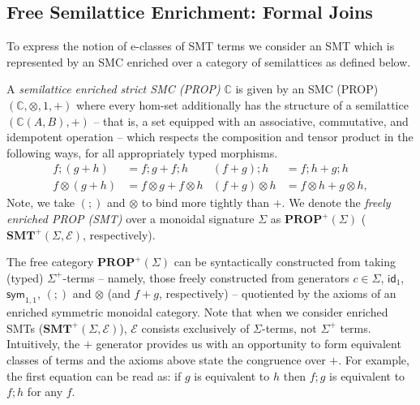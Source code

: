 \documentclass[sigconf, 9pt, nonacm]{acmart}
\newcommand\sym{\textsf{sym}}
\begin{document}
\subsection{Free Semilattice Enrichment: Formal Joins}

To express the notion of e-classes of SMT terms we consider an SMT which is represented by an SMC enriched over a category of semilattices as defined below.

\begin{definition}\label{def:enriched-prop}
A \textit{semilattice enriched strict SMC (PROP)}  $\mathbb{C}$ is given by an SMC (PROP) $(\mathbb{C}, \otimes, 1,+)$ where every hom-set additionally has the structure of a semilattice $(\mathbb{C}(A,B), +)$ -- that is,  a set equipped with an associative,  commutative,  and idempotent operation -- which respects the composition and tensor product in the following ways,  for all appropriately typed morphisms. 
\begin{align*}
f ; (g+h) &= f;g + f;h &
(f+g) ; h &= f;h + g;h \\
f \otimes (g+h) &= f \otimes g + f \otimes h & 
(f+g) \otimes h &= f \otimes h + g \otimes h,
\end{align*}
Note,  we take $(;\!)$ and $\otimes$ to bind more tightly than $+$.
We denote the \textit{freely enriched PROP (SMT)} over a monoidal signature $\Sigma$ as $\textbf{PROP}^+(\Sigma)$ ($\textbf{SMT}^+(\Sigma, \mathcal{E})$,  respectively).
\end{definition}

The free category $\textbf{PROP}^+(\Sigma)$ can be syntactically constructed from taking (typed) $\Sigma^+$-terms  -- namely, those freely constructed from generators $c \in \Sigma$, $\textsf{id}_1$, $\sym_{1,1}$, $(;\!)$ and $\otimes$ (and $f+g$, respectively) -- quotiented by the axioms of an enriched symmetric monoidal category.
Note that when we consider enriched SMTs ($\textbf{SMT}^{+}(\Sigma,\mathcal{E})$), $\mathcal{E}$ consists exclusively of $\Sigma$-terms, not $\Sigma^{+}$ terms.
Intuitively, the $+$ generator provides us with an opportunity to form equivalent classes of terms and the axioms above state the congruence over $+$.
For example, the first equation can be read as: if $g$ is equivalent to $h$ then $f;g$ is equivalent to $f;h$ for any $f$.
\end{document}
